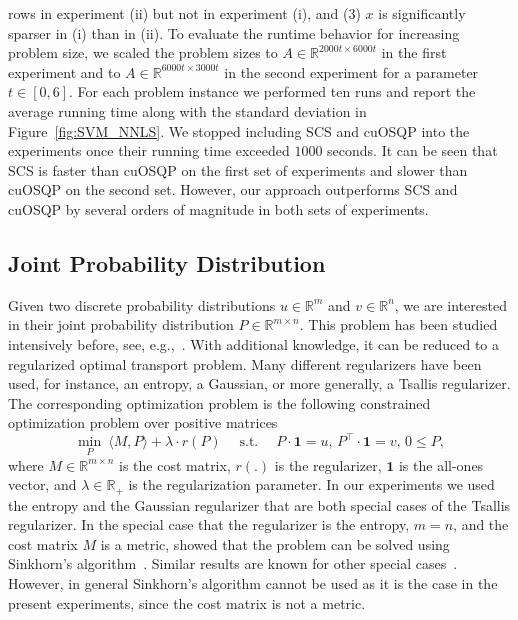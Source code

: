 \documentclass[letterpaper]{article} %
\DeclareMathOperator{\st}{s.t.}
\newcommand{\setR}{\mathbb{R}}
\newcommand{\vecOne}{\bm{1}}
\newcommand{\sprod}[2]{\langle{#1}, {#2}\rangle}
\begin{document}
rows in experiment (ii) but not in experiment (i), and
(3) $x$ is significantly sparser in (i) than in (ii). 
To evaluate the runtime behavior for increasing problem size, we scaled the problem sizes to $A\in\setR^{2000t \times 6000t}$ in the first experiment and to $A\in\setR^{6000t\times 3000t}$ in the second experiment for a parameter $t\in[0, 6]$. For each problem instance we performed ten runs and report the average running time along with the standard deviation in Figure~\ref{fig:SVM_NNLS}. We stopped including SCS and cuOSQP into the experiments once their running time exceeded $1000$ seconds. It can be seen that SCS is faster than cuOSQP on the first set of experiments and slower than cuOSQP on the second set. However, our approach outperforms SCS and cuOSQP by several orders of magnitude in both sets of experiments.

\subsection{Joint Probability Distribution}
Given two discrete probability distributions $u\in\setR^m$ and $v\in\setR^n$, we are interested in their joint probability distribution $P\in\setR^{m\times n}$. %
This problem has been studied intensively before, see, e.g.,~\cite{Cuturi13, FrognerP19, MuzellecNPN17}. With additional knowledge, it can be reduced to a regularized optimal transport problem. Many different regularizers have been used, for instance, an entropy, a Gaussian, or more generally, a Tsallis regularizer. The corresponding optimization problem is the following constrained optimization problem over positive matrices
\[
\min_{P}\: \sprod{M}{P} + \lambda \cdot r(P) \quad \st\quad P\cdot \vecOne = u,\, P^\top \cdot \vecOne = v,\, 0\leq P,
\]
where $M\in\setR^{m\times n}$ is the cost matrix, $r(.)$ is the regularizer, $\vecOne$ is the all-ones vector, and $\lambda\in\setR_+$ is the regularization parameter.
In our experiments we used the entropy and the Gaussian regularizer that are both special cases of the Tsallis regularizer. In the special case that the regularizer is the entropy, $m=n$, and the cost matrix $M$ is a metric, \cite{Cuturi13} showed that the problem can be solved using Sinkhorn's algorithm~\cite{Sinkhorn67}. Similar results are known for other special cases~\cite{JanatiMPC20}. However, in general  Sinkhorn's algorithm cannot be used as it is the case in the present experiments, since the cost matrix is not a metric.
\end{document}
